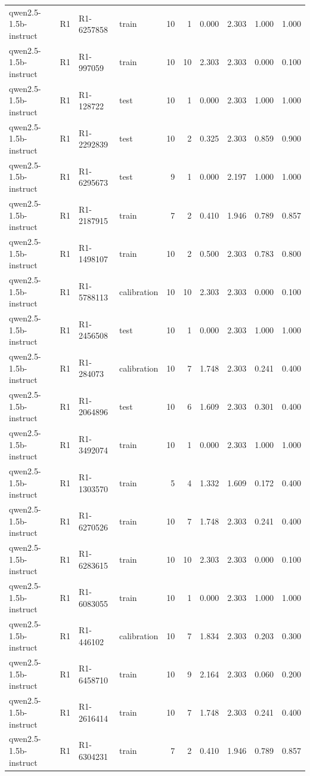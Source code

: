 \begin{table}
\begin{tabular}{llllrrrrrr}
qwen2.5-1.5b-instruct & R1 & R1-6257858 & train & 10 & 1 & 0.000 & 2.303 & 1.000 & 1.000 \\
qwen2.5-1.5b-instruct & R1 & R1-997059 & train & 10 & 10 & 2.303 & 2.303 & 0.000 & 0.100 \\
qwen2.5-1.5b-instruct & R1 & R1-128722 & test & 10 & 1 & 0.000 & 2.303 & 1.000 & 1.000 \\
qwen2.5-1.5b-instruct & R1 & R1-2292839 & test & 10 & 2 & 0.325 & 2.303 & 0.859 & 0.900 \\
qwen2.5-1.5b-instruct & R1 & R1-6295673 & test & 9 & 1 & 0.000 & 2.197 & 1.000 & 1.000 \\
qwen2.5-1.5b-instruct & R1 & R1-2187915 & train & 7 & 2 & 0.410 & 1.946 & 0.789 & 0.857 \\
qwen2.5-1.5b-instruct & R1 & R1-1498107 & train & 10 & 2 & 0.500 & 2.303 & 0.783 & 0.800 \\
qwen2.5-1.5b-instruct & R1 & R1-5788113 & calibration & 10 & 10 & 2.303 & 2.303 & 0.000 & 0.100 \\
qwen2.5-1.5b-instruct & R1 & R1-2456508 & test & 10 & 1 & 0.000 & 2.303 & 1.000 & 1.000 \\
qwen2.5-1.5b-instruct & R1 & R1-284073 & calibration & 10 & 7 & 1.748 & 2.303 & 0.241 & 0.400 \\
qwen2.5-1.5b-instruct & R1 & R1-2064896 & test & 10 & 6 & 1.609 & 2.303 & 0.301 & 0.400 \\
qwen2.5-1.5b-instruct & R1 & R1-3492074 & train & 10 & 1 & 0.000 & 2.303 & 1.000 & 1.000 \\
qwen2.5-1.5b-instruct & R1 & R1-1303570 & train & 5 & 4 & 1.332 & 1.609 & 0.172 & 0.400 \\
qwen2.5-1.5b-instruct & R1 & R1-6270526 & train & 10 & 7 & 1.748 & 2.303 & 0.241 & 0.400 \\
qwen2.5-1.5b-instruct & R1 & R1-6283615 & train & 10 & 10 & 2.303 & 2.303 & 0.000 & 0.100 \\
qwen2.5-1.5b-instruct & R1 & R1-6083055 & train & 10 & 1 & 0.000 & 2.303 & 1.000 & 1.000 \\
qwen2.5-1.5b-instruct & R1 & R1-446102 & calibration & 10 & 7 & 1.834 & 2.303 & 0.203 & 0.300 \\
qwen2.5-1.5b-instruct & R1 & R1-6458710 & train & 10 & 9 & 2.164 & 2.303 & 0.060 & 0.200 \\
qwen2.5-1.5b-instruct & R1 & R1-2616414 & train & 10 & 7 & 1.748 & 2.303 & 0.241 & 0.400 \\
qwen2.5-1.5b-instruct & R1 & R1-6304231 & train & 7 & 2 & 0.410 & 1.946 & 0.789 & 0.857 \\

\end{tabular}
\end{table}
